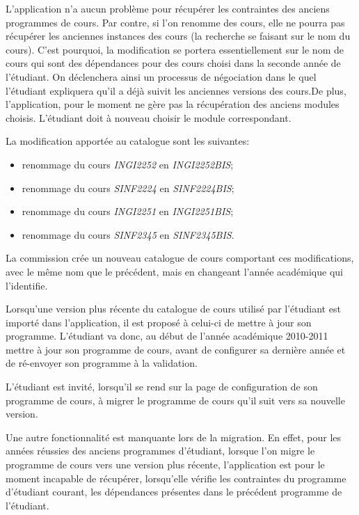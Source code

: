 L'application n'a aucun problème pour récupérer les contraintes des anciens programmes de cours. Par contre, si l'on renomme des cours, elle ne pourra pas récupérer les anciennes instances des cours (la recherche se faisant sur le nom du cours). C'est pourquoi, la modification se portera essentiellement sur le nom de cours qui sont des dépendances pour des cours choisi dans la seconde année de l'étudiant. On déclenchera ainsi un processus de négociation dans le quel l'étudiant expliquera qu'il a déjà suivit les anciennes versions des cours.De plus, l'application, pour le moment ne gère pas la récupération des anciens modules choisis. L'étudiant doit à nouveau choisir le module correspondant. 

La modification apportée au catalogue sont les suivantes:
\begin{itemize}
\item renommage du cours \textit{INGI2252} en \textit{INGI2252BIS};
\item renommage du cours \textit{SINF2224} en \textit{SINF2224BIS};
\item renommage du cours \textit{INGI2251} en \textit{INGI2251BIS};
\item renommage du cours \textit{SINF2345} en \textit{SINF2345BIS}.
\end{itemize}

La commission crée un nouveau catalogue de cours comportant ces modifications, avec le même nom que le précédent, mais en changeant l'année académique qui l'identifie. 

Lorsqu'une version plus récente du catalogue de cours utilisé par l'étudiant est importé dans l'application, il est proposé à celui-ci de mettre à jour son programme. L'étudiant va donc, au début de l'année académique 2010-2011 mettre à jour son programme de cours, avant de configurer sa dernière année et de ré-envoyer son programme à la validation.

L'étudiant est invité, lorsqu'il se rend sur la page de configuration de son programme de cours, à migrer le programme de cours qu'il suit vers sa nouvelle version.

Une autre fonctionnalité est manquante lors de la migration. En effet, pour les années réussies des anciens programmes d'étudiant, lorsque l'on migre le programme de cours vers une version plus récente, l'application est pour le moment incapable de récupérer, lorsqu'elle vérifie les contraintes du programme d'étudiant courant, les dépendances présentes dans le précédent programme de l'étudiant.

